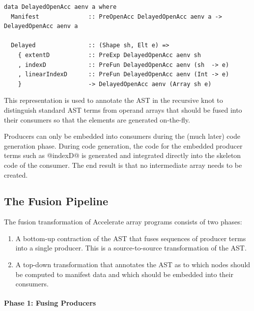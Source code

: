 \begin{lstlisting}[style=haskell
    ,name=DelayedOpenAcc
    ,label=lst:DelayedOpenAcc
    ,caption={The type of delayed arrays in Accelerate}]
data DelayedOpenAcc aenv a where
  Manifest              :: PreOpenAcc DelayedOpenAcc aenv a -> DelayedOpenAcc aenv a

  Delayed               :: (Shape sh, Elt e) =>
    { extentD           :: PreExp DelayedOpenAcc aenv sh
    , indexD            :: PreFun DelayedOpenAcc aenv (sh  -> e)
    , linearIndexD      :: PreFun DelayedOpenAcc aenv (Int -> e)
    }                   -> DelayedOpenAcc aenv (Array sh e)
\end{lstlisting}

This representation is used to annotate the AST in
the recursive knot to distinguish standard AST terms from operand arrays that
should be fused into their consumers so that the elements are generated
on-the-fly.

Producers can only be embedded into consumers during the (much later) code
generation phase. During code generation, the code for the embedded producer
terms such as @indexD@ is generated and integrated directly into the
skeleton code of the consumer. The end result is that no intermediate array
needs to be created.


\subsection{The Fusion Pipeline}
\label{sec:fusion_pipeline}

The fusion transformation of Accelerate array programs consists of two phases:
%
\begin{enumerate}
    \item A bottom-up contraction of the AST that fuses sequences of producer
        terms into a single producer. This is a source-to-source transformation
        of the AST.

    \item A top-down transformation that annotates the AST as to which nodes
        should be computed to manifest data and which should be embedded into
        their consumers.
\end{enumerate}

\paragraph{Phase 1: Fusing Producers}
\label{sec:fusing_producers}

